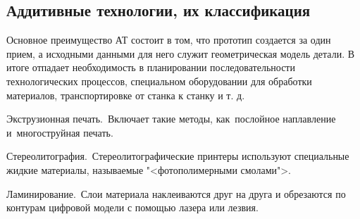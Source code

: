 \subsection{Аддитивные технологии, их классификация}

Основное преимущество АТ состоит в том, что прототип создается за один прием, а исходными данными для него служит геометрическая модель детали. В итоге отпадает необходимость в планировании последовательности технологических процессов, специальном оборудовании для обработки материалов, транспортировке от станка к станку и т. д.

Экструзионная печать. Включает такие методы, как послойное наплавление и многоструйная печать.

Стереолитография. Стереолитографические принтеры используют специальные жидкие материалы, называемые "<фотополимерными смолами">.

Ламинирование. Слои материала наклеиваются друг на друга и обрезаются по контурам цифровой модели с помощью лазера или лезвия. 

